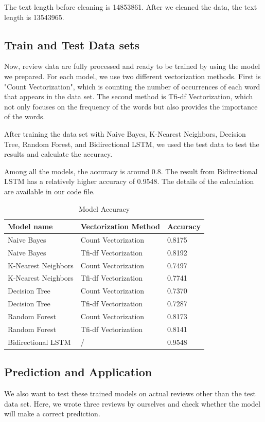 \documentclass{article}
\begin{document}
\noindent
The text length before cleaning is 14853861. After we cleaned the data, the text length is 13543965.

\subsection{Train and Test Data sets}

Now, review data are fully processed and ready to be trained by using the model we prepared. For each model, we use two different vectorization methods. First is "Count Vectorization", which is counting the number of occurrences of each word that appears in the data set. The second method is Tfi-df Vectorization, which not only focuses on the frequency of the words but also provides the importance of the words. \newline

\noindent
After training the data set with Naive Bayes, K-Nearest Neighbors, Decision Tree, Random Forest, and Bidirectional LSTM, we used the test data to test the results and calculate the accuracy. \newline

\noindent
Among all the models, the accuracy is around 0.8. The result from Bidirectional LSTM has a relatively higher accuracy of 0.9548. The details of the calculation are available in our code file.
\begin{table}[h]
\centering
\begin{tabular}{m|m|m}
Model name & Vectorization Method & Accuracy \\\hline
Naive Bayes & Count Vectorization & 0.8175 \\
Naive Bayes & Tfi-df Vectorization & 0.8192 \\
K-Nearest Neighbors & Count Vectorization & 0.7497 \\
K-Nearest Neighbors & Tfi-df Vectorization & 0.7741 \\
Decision Tree & Count Vectorization & 0.7370 \\
Decision Tree & Tfi-df Vectorization & 0.7287 \\ 
Random Forest & Count Vectorization & 0.8173 \\
Random Forest & Tfi-df Vectorization & 0.8141 \\
Bidirectional LSTM & / & 0.9548
\end{tabular}
\caption{\label{tab:widgets}Model Accuracy}
\end{table}

\subsection{Prediction and Application}
We also want to test these trained models on actual reviews other than the test data set. Here, we wrote three reviews by ourselves and check whether the model will make a correct prediction. \newline
\end{document}
